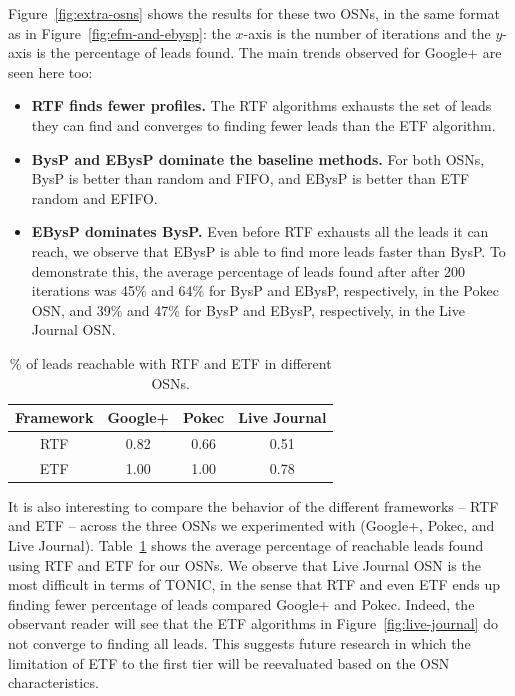 \documentclass[journal]{IEEEtran}
\begin{document}
Figure~\ref{fig:extra-osns} shows the results for these two OSNs, in the same format as in Figure~\ref{fig:efm-and-ebysp}: the $x$-axis is the number of iterations and the $y$-axis is the percentage of leads found. The main trends observed for Google+ are seen here too:
\begin{itemize}
\item {\bf RTF finds fewer profiles.} The RTF algorithms exhausts the set of leads they can find and converges to finding fewer leads than the ETF algorithm.
\item {\bf BysP and EBysP dominate the baseline methods.} For both OSNs, BysP is better than random and FIFO, and EBysP is better than ETF random and EFIFO. 
\item {\bf EBysP dominates BysP.} Even before RTF exhausts all the leads it can reach, we observe that EBysP is able to find more leads faster than BysP. To demonstrate this, the average percentage of leads found after after 200 iterations was 45\% and 64\% for BysP and EBysP, respectively, in the Pokec OSN, and 39\% and 47\% for BysP and EBysP, respectively, in the Live Journal OSN. 
\end{itemize}




\begin{table}
\centering
\begin{tabular}{c|c|c|c}
Framework & Google+ & Pokec & Live Journal \\ \hline
RTF & 0.82 & 0.66 & 0.51 \\ 
ETF & 1.00 & 1.00 & 0.78 \\
\end{tabular}
\caption{\% of leads reachable with RTF and ETF in different OSNs.}
\label{tab:tiers-other-osns}
\end{table}

It is also interesting to compare the behavior of the different frameworks -- RTF and ETF -- across the three OSNs we experimented with (Google+, Pokec, and Live Journal). Table~\ref{tab:tiers-other-osns} shows the average percentage of reachable leads found using RTF and ETF for our OSNs. We observe that Live Journal OSN is the most difficult in terms of TONIC, in the sense that RTF and even ETF ends up finding fewer percentage of leads compared Google+ and Pokec. Indeed, the observant reader will see that the ETF algorithms in Figure~\ref{fig:live-journal} do not converge to finding all leads. This suggests future research in which the limitation of ETF to the first tier will be reevaluated based on the OSN characteristics. 
\end{document}
